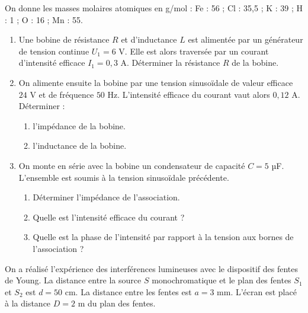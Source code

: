\documentclass[11pt]{article}
\begin{document}
\noindent On donne les masses molaires atomiques en g/mol : Fe : 56 ; Cl : 35,5 ; K : 39 ; H : 1 ; O : 16 ; Mn : 55.


\begin{enumerate}
  \item Une bobine de résistance $R$ et d'inductance $L$ est alimentée par un générateur de tension continue $U_1 = 6$ V. Elle est alors traversée par un courant d'intensité efficace $I_1 = 0{,}3$ A. Déterminer la résistance $R$ de la bobine.
  \item On alimente ensuite la bobine par une tension sinusoïdale de valeur efficace $24$ V et de fréquence $50$ Hz. L'intensité efficace du courant vaut alors $0{,}12$ A. Déterminer :
  \begin{enumerate}[label=\alph*.]
    \item l'impédance de la bobine.
    \item l'inductance de la bobine.
  \end{enumerate}
  \item On monte en série avec la bobine un condensateur de capacité $C = 5$ µF. L'ensemble est soumis à la tension sinusoïdale précédente.
  \begin{enumerate}[label=\alph*.]
    \item Déterminer l'impédance de l'association.
    \item Quelle est l'intensité efficace du courant ?
    \item Quelle est la phase de l'intensité par rapport à la tension aux bornes de l'association ?
  \end{enumerate}
\end{enumerate}

On a réalisé l'expérience des interférences lumineuses avec le dispositif des fentes de Young. La distance entre la source $S$ monochromatique et le plan des fentes $S_1$ et $S_2$ est $d = 50$ cm. La distance entre les fentes est $a = 3$ mm. L'écran est placé à la distance $D = 2$ m du plan des fentes.

\begin{center}
\end{center}
\end{document}
